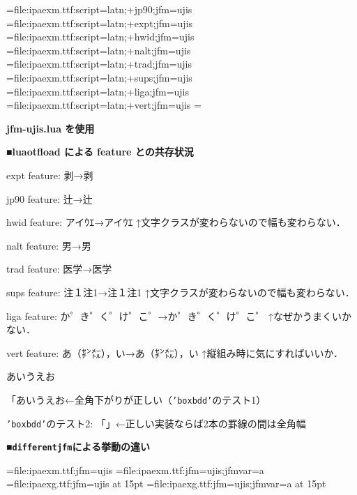 

\jfont\jisninety={file:ipaexm.ttf:script=latn;+jp90;jfm=ujis}
\jfont\jisexpt={file:ipaexm.ttf:script=latn;+expt;jfm=ujis}
\jfont\jishwid={file:ipaexm.ttf:script=latn;+hwid;jfm=ujis}
\jfont\jisnalt={file:ipaexm.ttf:script=latn;+nalt;jfm=ujis}
\jfont\jistrad={file:ipaexm.ttf:script=latn;+trad;jfm=ujis}
\jfont\jissups={file:ipaexm.ttf:script=latn;+sups;jfm=ujis}
\jfont\jisliga={file:ipaexm.ttf:script=latn;+liga;jfm=ujis}
\jfont\jisvert={file:ipaexm.ttf:script=latn;+vert;jfm=ujis}
\parskip=\smallskipamount{}\zw

{\noindent\bf\tengt jfm-ujis.lua を使用}

\bigskip

{\noindent\bf\tengt ■luaotf\/load による feature との共存状況}

{\tentt expt} feature: 剥→{\jisexpt 剥}

{\tentt jp90} feature: 辻→{\jisninety 辻}

{\tentt hwid} feature: アイｳｴ→{\jishwid アイｳｴ}\hfil\break
↑文字クラスが変わらないので幅も変わらない．

{\tentt nalt} feature: 男→{\jisnalt 男}

{\tentt trad} feature: 医学→{\jistrad 医学}

{\tentt sups} feature: 注１注1→{\jissups 注１注1}\hfil\break
↑文字クラスが変わらないので幅も変わらない．

{\tentt liga} feature: か゜き゜く゜け゜こ゜→{\jisliga か゜き゜く゜け゜こ゜}\hfil\break
↑なぜかうまくいかない．%

{\tentt vert} feature: あ（㌢㍍），い→{\jisvert あ（㌢㍍），い}\hfil\break
↑縦組み時に気にすればいいか．

\bigskip

\noindent あいうえお

「あいうえお←全角下がりが正しい（{\tt'boxbdd'}のテスト1）

{\tt'boxbdd'}のテスト2: \vrule\hbox{「」}\vrule ←正しい実装ならば2本の罫線の間は全角幅


\bigskip
{\noindent\bf\tengt ■{\tt differentjfm}による挙動の違い}

\jfont\tenMa={file:ipaexm.ttf:jfm=ujis}
\jfont\tenMb={file:ipaexm.ttf:jfm=ujis;jfmvar=a}
\jfont\tenGa={file:ipaexg.ttf:jfm=ujis} at 15pt
\jfont\tenGb={file:ipaexg.ttf:jfm=ujis;jfmvar=a} at 15pt\relax

